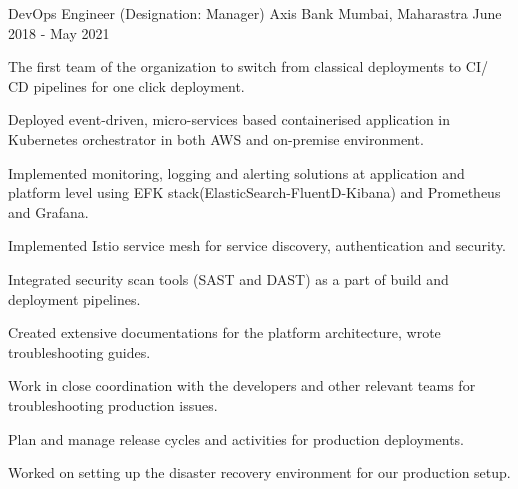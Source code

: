 \begin{cventries}
{\begin{cvitems}
  \end{cvitems}
  }
  \cventry
    {DevOps Engineer (Designation: Manager)} %
    {Axis Bank} %
    {Mumbai, Maharastra} %
    {June 2018 - May 2021} %
    {
      \begin{cvitems} %
        \item {The first team of the organization to switch from classical deployments to CI/ CD pipelines for one click deployment.}
        \item {Deployed event-driven, micro-services based containerised application in Kubernetes orchestrator in both AWS and on-premise environment.}
        \item {Implemented monitoring, logging and alerting solutions at application and platform level using EFK stack(ElasticSearch-FluentD-Kibana) and Prometheus and Grafana.}
        \item {Implemented Istio service mesh for service discovery, authentication and security.}
        \item {Integrated security scan tools (SAST and DAST) as a part of build and deployment pipelines.}
        \item {Created extensive documentations for the platform architecture, wrote troubleshooting guides.}
        \item {Work in close coordination with the developers and other relevant teams for troubleshooting production issues.}
        \item {Plan and manage release cycles and activities for production deployments.}
        \item {Worked on setting up the disaster recovery environment for our production setup.}
          \end{cvitems}
    }
\end{cventries}
